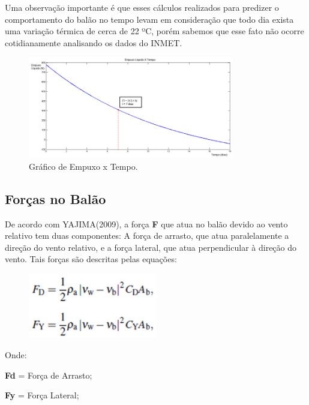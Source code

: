 	Uma observação importante é que esses cálculos realizados para predizer o comportamento do balão no tempo levam em consideração que todo dia exista uma variação térmica de cerca de 22 ºC, porém sabemos que esse fato não ocorre cotidianamente analisando os dados do INMET.


	\begin{figure}[H]
		\centering
		\includegraphics[width=0.8\textwidth]{figuras/empuxoLiquidoTempo}
		\caption{Gráfico de Empuxo x Tempo.}
		\label{img:empuxoLiquidoTempo}
	\end{figure}

\subsection{Forças no Balão} %
\label{sub:for_as_no_bal_o}

De acordo com YAJIMA(2009), a força \textbf{F} que atua no balão devido ao vento relativo tem duas componentes: A força de arrasto, que atua paralelamente a direção do vento relativo, e a força lateral, que atua perpendicular à direção do vento.
Tais forças são descritas pelas equações:

	\begin{figure}[H]
		\centering
		\includegraphics[width=0.5\textwidth]{figuras/equacoesArrasto}
		\caption{}
		\label{img:equacoesArrasto}
	\end{figure}

	Onde: 

	\textbf{Fd} = Força de Arrasto; 

	\textbf{Fy} = Força Lateral; 


